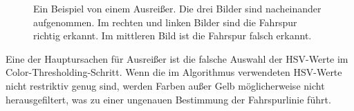 \documentclass[arbeit=studie,oneside,BCOR=12mm]{ArbeitRST}
\begin{document}
\begin{figure}[h]
    \centering
    \caption{Ein Beispiel von einem Ausrei{\ss}er. Die drei Bilder sind
    nacheinander aufgenommen. Im rechten und linken Bilder sind die Fahrspur
    richtig erkannt. Im mittleren Bild ist die Fahrspur falsch erkannt.}
    \label{ausrei}
\end{figure}

Eine der Hauptursachen für Ausreißer ist die falsche Auswahl der HSV-Werte im Color-Thresholding-Schritt.
Wenn die im Algorithmus verwendeten HSV-Werte nicht restriktiv genug sind,
werden Farben außer Gelb möglicherweise nicht herausgefiltert, was zu einer
ungenauen Bestimmung der Fahrspurlinie führt.
\end{document}
